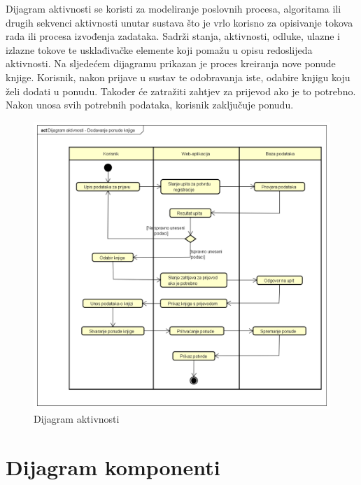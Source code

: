 			
			Dijagram aktivnosti se koristi za modeliranje poslovnih procesa, algoritama ili drugih sekvenci aktivnosti unutar sustava što je vrlo korisno za opisivanje tokova rada ili procesa izvođenja zadataka. Sadrži stanja, aktivnosti, odluke, ulazne i izlazne tokove te usklađivačke elemente koji pomažu u opisu redoslijeda aktivnosti. Na sljedećem dijagramu prikazan je proces kreiranja nove ponude knjige. Korisnik, nakon prijave u sustav te odobravanja iste, odabire knjigu koju želi dodati u ponudu. Također će zatražiti zahtjev za prijevod ako je to potrebno.
			Nakon unosa svih potrebnih podataka, korisnik zaključuje ponudu. 
			
			\eject
			
			
			\begin{figure}[H]
				\includegraphics[width=\textwidth]{dijagrami/Dijagram aktivnosti.PNG} %
				\centering
				\caption{Dijagram aktivnosti }
				\label{fig:dijagramaktivnosti1}
			\end{figure}
			
			\eject
			
		\section{Dijagram komponenti}
		

